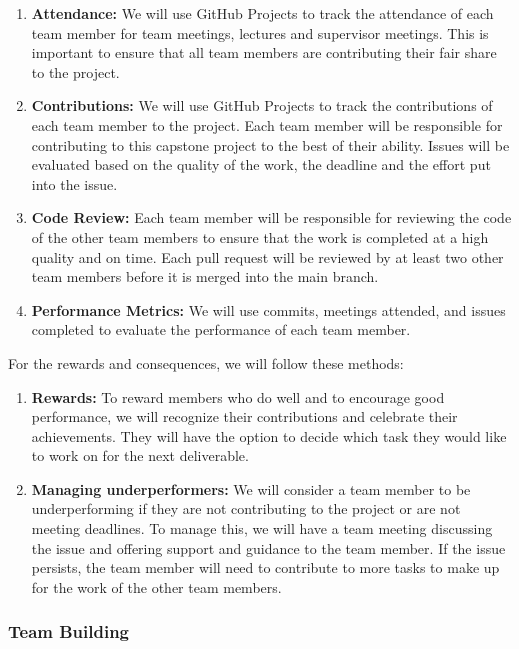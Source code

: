 \documentclass{article}
\begin{document}
\begin{enumerate}
  \item \textbf{Attendance:} We will use GitHub Projects to track the attendance of each team member for team meetings, lectures and supervisor meetings. This is important to ensure that all team members are contributing their fair share to the project.
  \item \textbf{Contributions:} We will use GitHub Projects to track the contributions of each team member to the project. Each team member will be responsible for contributing to this capstone project to the best of their ability. Issues will be evaluated based on the quality of the work, the deadline and the effort put into the issue.
  \item \textbf{Code Review:} Each team member will be responsible for reviewing the code of the other team members to ensure that the work is completed at a high quality and on time. Each pull request will be reviewed by at least two other team members before it is merged into the main branch.
  \item \textbf{Performance Metrics:} We will use commits, meetings attended, and issues completed to evaluate the performance of each team member.
\end{enumerate}

For the rewards and consequences, we will follow these methods:

\begin{enumerate}
  \item \textbf{Rewards:} To reward members who do well and to encourage good performance, we will recognize their contributions and celebrate their achievements. They will have the option to decide which task they would like to work on for the next deliverable.
  \item \textbf{Managing underperformers:} We will consider a team member to be underperforming if they are not contributing to the project or are not meeting deadlines. To manage this, we will have a team meeting discussing the issue and offering support and guidance to the team member. If the issue persists, the team member will need to contribute to more tasks to make up for the work of the other team members.
\end{enumerate}


\subsubsection*{Team Building}
\iffalse
\wss{How will you build team cohesion (fun time, group rituals, etc.)? }
\fi
\end{document}
